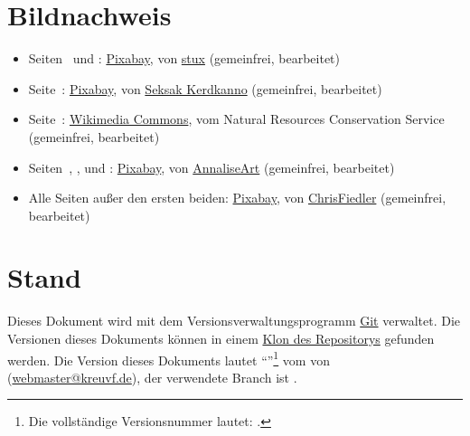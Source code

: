 \section{Bildnachweis}
\begin{itemize}
	\item Seiten~\pageref{img-title} und \pageref{img-title-grey}: \href{https://pixabay.com/images/id-437262/}{Pixabay}, von \href{https://pixabay.com/users/stux-12364/}{stux} (gemeinfrei, bearbeitet)
	\item Seite~\pageref{img-herbs-title}: \href{https://pixabay.com/images/id-906140/}{Pixabay}, von \href{https://pixabay.com/users/kerdkanno-1334070/}{Seksak Kerdkanno} (gemeinfrei, bearbeitet)
	\item Seite~\pageref{img-white-lotus}: \href{https://commons.wikimedia.org/w/index.php?title=File:Nelumbo_lutea_blossom.jpeg&oldid=141771386}{Wikimedia Commons}, vom Natural Resources Conservation Service (gemeinfrei, bearbeitet)
	\item Seiten~\pageref{img-divider-a}, \pageref{img-divider-b}, \pageref{img-divider-c} und \pageref{img-divider-d}: \href{https://pixabay.com/images/id-4869416/}{Pixabay}, von \href{https://pixabay.com/users/AnnaliseArt-7089643/}{AnnaliseArt} (gemeinfrei, bearbeitet)
	\item Alle Seiten außer den ersten beiden: \href{https://pixabay.com/images/id-1074131/}{Pixabay}, von \href{https://pixabay.com/users/ChrisFiedler-935884/}{ChrisFiedler} (gemeinfrei, bearbeitet)

\end{itemize}

\section{Stand\label{version-info}}
Dieses Dokument wird mit dem Versionsverwaltungsprogramm \href{https://git-scm.com/}{Git} verwaltet. Die Versionen dieses Dokuments können in einem \href{https://github.com/kreuvf/dsa-sucht-drogen}{Klon des Repositorys} gefunden werden. Die Version dieses Dokuments lautet \enquote{\gitAbbrevHash{}}\footnote{Die vollständige Versionsnummer lautet: \gitHash{}.} vom \gitAuthorIsoDate{} von \gitAuthorName{} (\href{mailto:webmaster@kreuvf.de}{webmaster@kreuvf.de}), der verwendete Branch ist \gitBranch.

